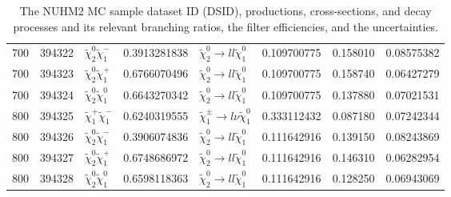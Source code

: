 \begin{table}[htb]
{{\begin{tabular}{llllllll}
                700             & 394322 & $\widetilde{\chi}^{0}_{2}\widetilde{\chi}^{-}_{1}$ & 0.3913281838       & $\widetilde{\chi}^{0}_{2} \rightarrow l l \widetilde{\chi}^{0}_{1}$     &  0.109700775 &  0.158010         &  0.08575382\\
                700             & 394323 & $\widetilde{\chi}^{0}_{2}\widetilde{\chi}^{+}_{1}$ & 0.6766070496       & $\widetilde{\chi}^{0}_{2} \rightarrow l l \widetilde{\chi}^{0}_{1}$     &  0.109700775 &  0.158740         &  0.06427279\\
                700             & 394324 & $\widetilde{\chi}^{0}_{2}\widetilde{\chi}^{0}_{1}$ & 0.6643270342       & $\widetilde{\chi}^{0}_{2} \rightarrow l l \widetilde{\chi}^{0}_{1}$     &  0.109700775 &  0.137880         &  0.07021531\\
                \hline
                800             & 394325 & $\widetilde{\chi}^{+}_{1}\widetilde{\chi}^{-}_{1}$ & 0.6240319555       & $\widetilde{\chi}^{\pm}_{1} \rightarrow l \nu \widetilde{\chi}^{0}_{1}$ &  0.333112432 &  0.087180         &  0.07242344\\
                800             & 394326 & $\widetilde{\chi}^{0}_{2}\widetilde{\chi}^{-}_{1}$ & 0.3906074836       & $\widetilde{\chi}^{0}_{2} \rightarrow l l \widetilde{\chi}^{0}_{1}$     &  0.111642916 &  0.139150         &  0.08243869\\
                800             & 394327 & $\widetilde{\chi}^{0}_{2}\widetilde{\chi}^{+}_{1}$ & 0.6748686972       & $\widetilde{\chi}^{0}_{2} \rightarrow l l \widetilde{\chi}^{0}_{1}$     &  0.111642916 &  0.146310         &  0.06282954\\
                800             & 394328 & $\widetilde{\chi}^{0}_{2}\widetilde{\chi}^{0}_{1}$ & 0.6598118363       & $\widetilde{\chi}^{0}_{2} \rightarrow l l \widetilde{\chi}^{0}_{1}$     &  0.111642916 &  0.128250         &  0.06943069\\
                \hline
                \hline
            \end{tabular}
        }
    }
    \caption{The NUHM2 MC sample dataset ID (DSID), productions, cross-sections, and decay processes and its relevant branching ratios, the filter efficiencies, and the uncertainties.}
    \label{tab:data_NUHM2_mcprod}
\end{table}%

